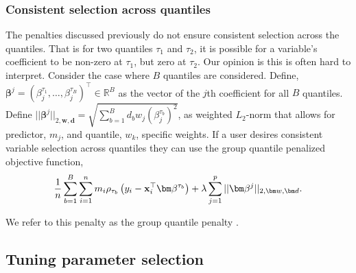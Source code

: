 \subsubsection{Consistent selection across quantiles}\label{consistent-selection-across-quantiles}

The penalties discussed previously do not ensure consistent selection across the quantiles. That is for two quantiles \(\tau_1\) and \(\tau_2\), it is possible for a variable's coefficient to be non-zero at \(\tau_1\), but zero at \(\tau_2\). Our opinion is this is often hard to interpret. Consider the case where \(B\) quantiles are considered. Define, \(\bm \beta^j = (\beta_{j}^{\tau_1},\ldots,\beta^{\tau_B}_j)^\top \in \mathbb{R}^{B}\) as the vector of the \(j\)th coefficient for all \(B\) quantiles. Define \(||\bm \beta^j||_{2,\bm w,\bm d}=\sqrt{\sum_{b=1}^B d_b w_j (\beta^{\tau_b}_{j})^2}\), as weighted \(L_2\)-norm that allows for predictor, \(m_j\), and quantile, \(w_k\), specific weights. If a user desires consistent variable selection across quantiles they can use the group quantile penalized objective function,
\begin{equation}
\frac{1}{n} \sum_{b=1}^B \sum_{i=1}^n m_i \rho_{\tau_b}\left(y_i - {\bf x}_i^\top\bm \beta^{\tau_b}\right) + \lambda \sum_{j=1}^p ||\bm \beta^j||_{2,\bm w,\bm d}.
\label{eq:gql}
\end{equation}

We refer to this penalty as the group quantile penalty \citep{gqlasso}.

\subsection{Tuning parameter selection}\label{tuning-parameter-selection}

